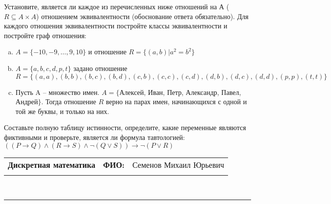 \documentclass[10pt]{exam}
\newcommand{\class}{Дискретная математика}
\newcommand{\examdate}{}
\begin{document}
\begin{questions}
\question
Установите, является ли каждое из перечисленных ниже отношений на А ($R \subseteq A \times A$) отношением эквивалентности (обоснование ответа обязательно). Для каждого отношения эквивалентности постройте классы 
эквивалентности и постройте граф отношения:
\begin{enumerate} [a)]\setcounter{enumi}{0}
\item $A = \{-10, -9, … , 9, 10\}$ и отношение $R = \{(a,b)|a^{2} = b^{2}\}$
\item $A = \{a, b, c, d, p, t\}$ задано отношение $R = \{(a, a), (b, b), (b, c), (b, d), (c, b), (c, c), (c, d), (d, b), (d, c), (d, d), (p,p), (t,t)\}$
\item Пусть A – множество имен. $A = \{ $Алексей, Иван, Петр, Александр, Павел, Андрей$ \}$. Тогда отношение $R$ верно на парах имен, начинающихся с одной и той же буквы, и только на них.
\end{enumerate}\question Составьте полную таблицу истинности, определите, какие переменные являются фиктивными и проверьте, является ли формула тавтологией:
$((P \rightarrow Q) \land (R \rightarrow S) \land \neg (Q \lor S)) \rightarrow \neg (P \lor R)$

\end{questions}
\newpage
\begin{flushright}
\begin{tabular}{p{2.8in} r l}
\textbf{\class} & \textbf{ФИО:} &Семенов Михаил Юрьевич
\\

\textbf{\examdate} &&\\
\end{tabular}\\
\end{flushright}
\rule[1ex]{\textwidth}{.1pt}
\end{document}
